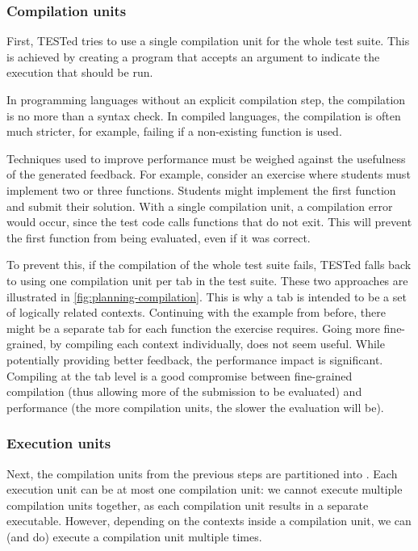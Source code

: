 \documentclass[../main]{subfiles}
\begin{document}
\subsubsection{Compilation units}
\label{subsubsec:compilation-units}

First, TESTed tries to use a single compilation unit for the whole test suite.
This is achieved by creating a program that accepts an argument to indicate the execution that should be run.

In programming languages without an explicit compilation step, the compilation is no more than a syntax check.
In compiled languages, the compilation is often much stricter, for example, failing if a non-existing function is used.

Techniques used to improve performance must be weighed against the usefulness of the generated feedback.
For example, consider an exercise where students must implement two or three functions.
Students might implement the first function and submit their solution.
With a single compilation unit, a compilation error would occur, since the test code calls functions that do not exit.
This will prevent the first function from being evaluated, even if it was correct.

To prevent this, if the compilation of the whole test suite fails, TESTed falls back to using one compilation unit per tab in the test suite.
These two approaches are illustrated in \cref{fig:planning-compilation}.
This is why a tab is intended to be a set of logically related contexts.
Continuing with the example from before, there might be a separate tab for each function the exercise requires.
Going more fine-grained, by compiling each context individually, does not seem useful.
While potentially providing better feedback, the performance impact is significant.
Compiling at the tab level is a good compromise between fine-grained compilation (thus allowing more of the submission to be evaluated) and performance (the more compilation units, the slower the evaluation will be).

\subsubsection{Execution units}

Next, the compilation units from the previous steps are partitioned into .
Each execution unit can be at most one compilation unit: we cannot execute multiple compilation units together,
as each compilation unit results in a separate executable.
However, depending on the contexts inside a compilation unit, we can (and do) execute a compilation unit multiple times.
\end{document}
